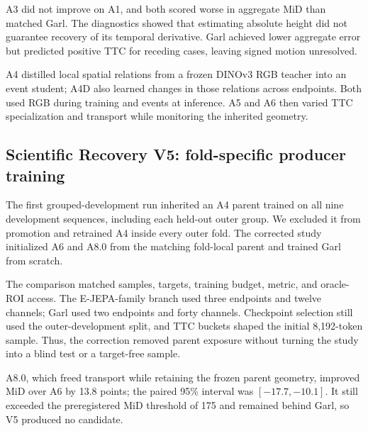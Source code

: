 \begin{table}[htbp]
\centering\small

\caption{Early eAP public-validation results for A0, A1, A3, and matched Garl.}
\label{tab:early-screen}
\end{table}

A3 did not improve on A1, and both scored worse in aggregate MiD than matched Garl. The diagnostics showed that estimating absolute height did not guarantee recovery of its temporal derivative. Garl achieved lower aggregate error but predicted positive TTC for receding cases, leaving signed motion unresolved. 

A4 distilled local spatial relations from a frozen DINOv3 RGB teacher into an event student; A4D also learned changes in those relations across endpoints. Both used RGB during training and events at inference. A5 and A6 then varied TTC specialization and transport while monitoring the inherited geometry.

\subsection{Scientific Recovery V5: fold-specific producer training}

The first grouped-development run inherited an A4 parent trained on all nine development sequences, including each held-out outer group. We excluded it from promotion and retrained A4 inside every outer fold. The corrected study initialized A6 and A8.0 from the matching fold-local parent and trained Garl from scratch. 

The comparison matched samples, targets, training budget, metric, and oracle-ROI access. The E-JEPA-family branch used three endpoints and twelve channels; Garl used two endpoints and forty channels. Checkpoint selection still used the outer-development split, and TTC buckets shaped the initial 8,192-token sample. Thus, the correction removed parent exposure without turning the study into a blind test or a target-free sample. 

\begin{table}[htbp]
\centering\small

\caption{Scientific Recovery V5--V6 results on 8,192 tokens from nine sequences, three folds, and seed 7.}
\label{tab:early-v5v6}
\end{table}

A8.0, which freed transport while retaining the frozen parent geometry, improved MiD over A6 by 13.8 points; the paired 95\% interval was $[-17.7,-10.1]$. It still exceeded the preregistered MiD threshold of 175 and remained behind Garl, so V5 produced no candidate. 

